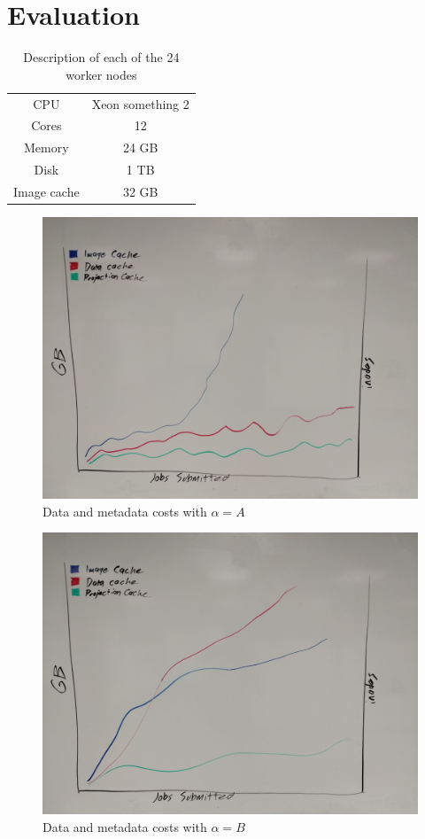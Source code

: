 \documentclass[conference]{IEEEtran}
\begin{document}
\section{Evaluation}

\begin{table}
\centering
\begin{tabular}{c c}
CPU & Xeon something 2 \\
Cores & 12 \\
Memory & 24 GB \\
Disk & 1 TB \\
Image cache & 32 GB \\
\end{tabular}
\caption{Description of each of the 24 worker nodes}
\label{tab:exp-setup}
\end{table}

\begin{figure}
\includegraphics[width=\linewidth]{plots/IMG_20181116_101513.jpg}
\caption{Data and metadata costs with $\alpha=A$}
\end{figure}

\begin{figure}
\includegraphics[width=\linewidth]{plots/IMG_20181116_101907.jpg}
\caption{Data and metadata costs with $\alpha=B$}
\end{figure}
\end{document}
